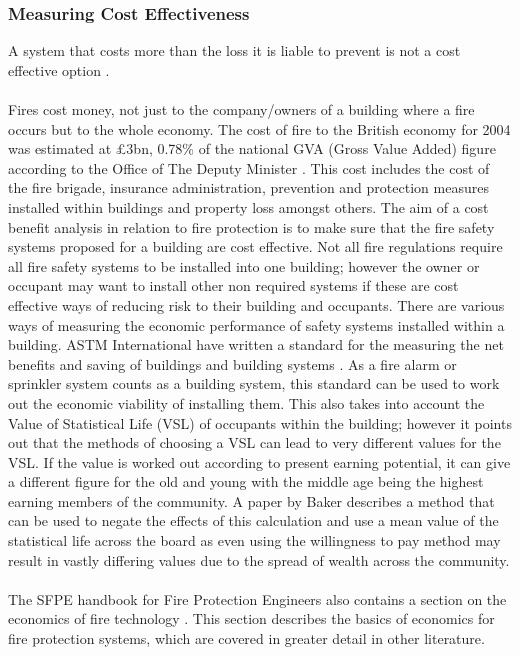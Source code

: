 \documentclass[table,a4paper,oneside]{book}
\begin{document}
\subsubsection{Measuring Cost Effectiveness}
A system that costs more than the loss it is liable to prevent is not a cost effective option \citep{Thor1980153}.
\\
\\
Fires cost money, not just to the company/owners of a building where a fire occurs but to the whole economy. The cost of fire to the British economy for 2004 was estimated at \pounds3bn, 0.78\% of the national GVA (Gross Value Added) figure according to the Office of The Deputy Minister \citep{TheDeputyPrimeMinister2006}. This cost includes the cost of the fire brigade, insurance administration, prevention and protection measures installed within buildings and property loss amongst others. 
The aim of a cost benefit analysis in relation to fire protection is to make sure that the fire safety systems proposed for a building are cost effective. Not all fire regulations require all fire safety systems to be installed into one building; however the owner or occupant may want to install other non required systems if these are cost effective ways of reducing risk to their building and occupants. There are various ways of measuring the economic performance of safety systems installed within a building. ASTM International have written a standard for the measuring the net benefits and saving of buildings and building systems \citep{ASTM2009}. As a fire alarm or sprinkler system counts as a building system, this standard can be used to work out the economic viability of installing them. This also takes into account the Value of Statistical Life (VSL) of occupants within the building; however it points out that the methods of choosing a VSL can lead to very different values for the VSL. If the value is worked out according to present earning potential, it can give a different figure for the old and young with the middle age being the highest earning members of the community. A paper by Baker \citep{Baker2009} describes a method that can be used to negate the effects of this calculation and use a mean value of the statistical life across the board  as even using the willingness to pay method may result in vastly differing values due to the spread of wealth across the community.
\\
\\
The SFPE handbook for Fire Protection Engineers also contains a section on the economics of fire technology \citep{FireProtectionEngineers2002}. This section describes the basics of economics for fire protection systems, which are covered in greater detail in other literature.
\end{document}
